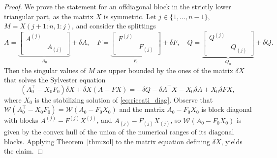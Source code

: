 \documentclass[a4paper,10pt]{article}
\begin{document}
\begin{proof}
	We prove the statement for an offdiagonal block in the strictly lower triangular part, as the matrix $X$ is symmetric. 
	Let $j\in\{1,\dots, n-1\}$, $M=X(j+1:n, 1:j)$, and consider the splittings
	$$
	A= \underbrace{\begin{bmatrix}
			A^{(j)}\\ & A_{(j)}
	\end{bmatrix}}_{A_0}+\delta A, \quad F= \underbrace{\begin{bmatrix}
			F^{(j)}\\ & F_{(j)}
	\end{bmatrix}}_{F_0}+\delta F,\quad Q= \underbrace{\begin{bmatrix}
			Q^{(j)}\\ & Q_{(j)}
	\end{bmatrix}}_{Q_0}+\delta Q.
	$$
	Then the singular values of $M$ are  upper bounded by the ones of the matrix $\delta X$ that solves the Sylvester equation
	$$
	(A_0^\top-X_0F_0)\delta X +\delta X(A-FX)= -\delta Q -\delta A^\top X-X_0\delta A+ X_0\delta FX,$$
	where $X_0$ is the stabilizing solution of \eqref{eq:riccati_diag}.
	Observe that  $\mathcal W(A_0^\top-X_0F_0)=\mathcal W(A_0-F_0X_0)$ and the matrix $A_0-F_0X_0$ is block diagonal with blocks $A^{(j)}-F^{(j)}X^{(j)}$, and $A_{(j)}-F_{(j)}X_{(j)}$, so  $\mathcal W(A_0-F_0X_0)$ is given by the convex hull of the union of the numerical ranges of its diagonal blocks. Applying Theorem~\ref{thm:zol} to the matrix equation defining $\delta X$, yields the claim. 
\end{proof}
\end{document}
